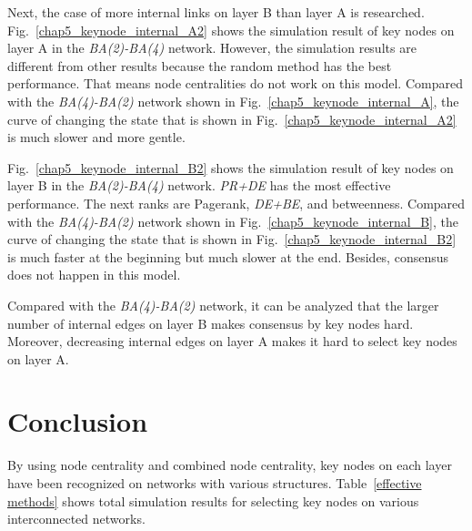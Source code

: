Next, the case of more internal links on layer B than layer A is researched. Fig.~\ref{chap5_keynode_internal_A2} shows the simulation result of key nodes on layer A in the \textit{BA(2)-BA(4)} network. However, the simulation results are different from other results because the random method has the best performance. That means node centralities do not work on this model. Compared with the \textit{BA(4)-BA(2)} network shown in Fig.~\ref{chap5_keynode_internal_A}, the curve of changing the state that is shown in Fig.~\ref{chap5_keynode_internal_A2}  is much slower and more gentle.

Fig.~\ref{chap5_keynode_internal_B2} shows the simulation result of key nodes on layer B in the \textit{BA(2)-BA(4)} network. \textit{PR+DE} has the most effective performance. The next ranks are Pagerank, \textit{DE+BE}, and betweenness. Compared with the \textit{BA(4)-BA(2)} network shown in Fig.~\ref{chap5_keynode_internal_B}, the curve of changing the state that is shown in Fig.~\ref{chap5_keynode_internal_B2} is much faster at the beginning but much slower at the end. Besides, consensus does not happen in this model.

Compared with the \textit{BA(4)-BA(2)} network, it can be analyzed that the larger number of internal edges on layer B makes consensus by key nodes hard. Moreover, decreasing internal edges on layer A makes it hard to select key nodes on layer A.\\   

\section{Conclusion}
By using node centrality and combined node centrality, key nodes on each layer have been recognized on networks with various structures. Table~\ref{effective methods} shows total simulation results for selecting key nodes on various interconnected networks.
 
